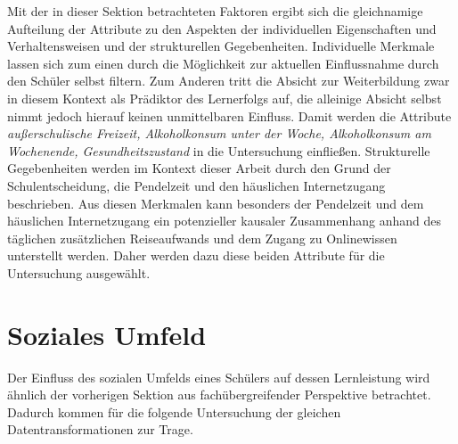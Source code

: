 Mit der in dieser Sektion betrachteten Faktoren ergibt sich die gleichnamige Aufteilung der Attribute zu den Aspekten der individuellen Eigenschaften und Verhaltensweisen und der strukturellen Gegebenheiten.
Individuelle Merkmale lassen sich zum einen durch die Möglichkeit zur aktuellen Einflussnahme durch den Schüler selbst filtern.
Zum Anderen tritt die Absicht zur Weiterbildung zwar in diesem Kontext als Prädiktor des Lernerfolgs auf, die alleinige Absicht selbst nimmt jedoch hierauf keinen unmittelbaren Einfluss.
Damit werden die Attribute \textit{außerschulische Freizeit, Alkoholkonsum unter der Woche, Alkoholkonsum am Wochenende, Gesundheitszustand} in die Untersuchung einfließen.
Strukturelle Gegebenheiten werden im Kontext dieser Arbeit durch den Grund der Schulentscheidung, die Pendelzeit und den häuslichen Internetzugang beschrieben.
Aus diesen Merkmalen kann besonders der Pendelzeit und dem häuslichen Internetzugang ein potenzieller kausaler Zusammenhang anhand des täglichen zusätzlichen Reiseaufwands und dem Zugang zu Onlinewissen unterstellt werden.
Daher werden dazu diese beiden Attribute für die Untersuchung ausgewählt.

\section{Soziales Umfeld}


Der Einfluss des sozialen Umfelds eines Schülers auf dessen Lernleistung wird ähnlich der vorherigen Sektion aus fachübergreifender Perspektive betrachtet.
Dadurch kommen für die folgende Untersuchung der gleichen Datentransformationen zur Trage.

